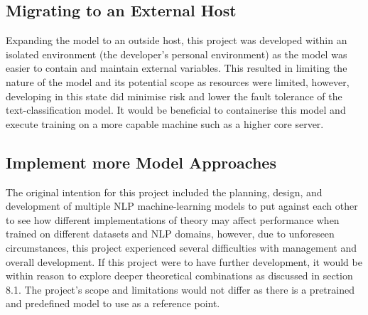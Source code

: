 \subsection{Migrating to an External Host}
Expanding the model to an outside host, this project was developed within an isolated environment (the developer’s personal environment) as the model was easier to contain and maintain external variables. This resulted in limiting the nature of the model and its potential scope as resources were limited, however, developing in this state did minimise risk and lower the fault tolerance of the text-classification model. It would be beneficial to containerise this model and execute training on a more capable machine such as a higher core server.

\subsection{Implement more Model Approaches}
The original intention for this project included the planning, design, and development of multiple NLP machine-learning models to put against each other to see how different implementations of theory may affect performance when trained on different datasets and NLP domains, however, due to unforeseen circumstances, this project experienced several difficulties with management and overall development. If this project were to have further development, it would be within reason to explore deeper theoretical combinations as discussed in section 8.1. The project’s scope and limitations would not differ as there is a pretrained and predefined model to use as a reference point.

